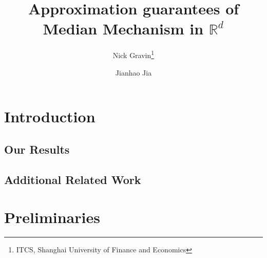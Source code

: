 \documentclass[11pt]{article} %
\title{Approximation guarantees of Median Mechanism in $\mathbb{R}^d$}
\author{Nick Gravin\thanks{ITCS, Shanghai University of Finance and Economics} \and Jianhao Jia\samethanks}
\date{}
\begin{document}
\maketitle


\begin{abstract}
    
\end{abstract}






\section{Introduction}
\label{sec:intro}


\subsection{Our Results}
\label{sec:results}


\subsection{Additional Related Work}
\label{sec:related}

% 

\section{Preliminaries}
\label{sec:prelim}


\end{document}
